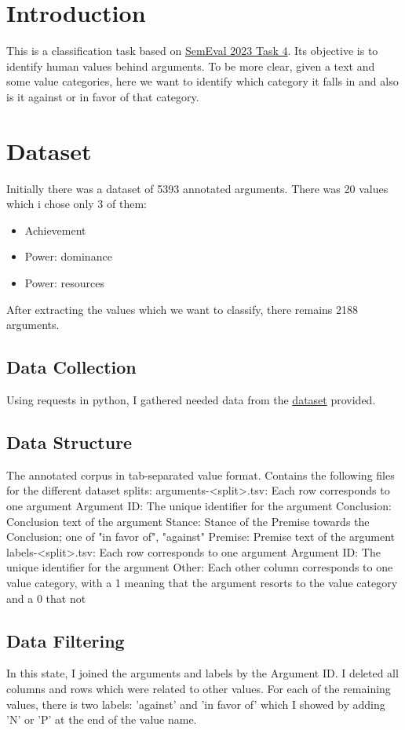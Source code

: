 
\section{Introduction}
This is a classification task based on \href{https://valueeval.webis.de/}{SemEval 2023 Task 4}. Its objective is to identify human values behind arguments.  
To be more clear, given a text and some value categories, here we want to identify which category it falls in and also is it against or in favor of that category. 

\section{Dataset}
Initially there was a dataset of 5393 annotated arguments. There was 20 values which i chose only 3 of them:
\begin{itemize}
	\item Achievement
	\item Power: dominance
	\item Power: resources
\end{itemize}
After extracting the values which we want to classify, there remains 2188 arguments.

\subsection{Data Collection}
Using requests in python, I gathered needed data from the \href{https://zenodo.org/record/7879430/files}{dataset} provided.

\subsection{Data Structure}
The annotated corpus in tab-separated value format. Contains the following files for the different dataset splits:
    arguments-<split>.tsv: Each row corresponds to one argument
        Argument ID: The unique identifier for the argument
        Conclusion: Conclusion text of the argument
        Stance: Stance of the Premise towards the Conclusion; one of "in favor of", "against"
        Premise: Premise text of the argument
    labels-<split>.tsv: Each row corresponds to one argument
        Argument ID: The unique identifier for the argument
        Other: Each other column corresponds to one value category, with a 1 meaning that the argument resorts to the value category and a 0 that not

\subsection{Data Filtering}
In this state, I joined the arguments and labels by the Argument ID. I deleted all columns and rows which were related to other values.
For each of the remaining values, there is two labels: 'against' and 'in favor of' which I showed by adding 'N' or 'P' at the end of the value name.

